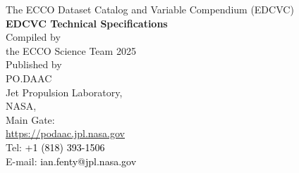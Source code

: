 \pagebreak
\begin{center}
    \vspace*{2cm}
    {\Large The ECCO Dataset Catalog and Variable Compendium (EDCVC)}\\[2cm]
    {\LARGE \textbf{EDCVC Technical Specifications}}\\[2cm]
    {\large Compiled by\\the ECCO Science Team 2025}\\[2cm]
    {\large Published by \\PO.DAAC\\
    Jet Propulsion Laboratory,\\
    NASA,\\
    Main Gate:\\
    \url{https://podaac.jpl.nasa.gov}}\\[2cm]
    {\large Tel: \textcolor{black}{+1 (818) 393-1506}\\[.5cm]
    E-mail: \textcolor{black}{ian.fenty@jpl.nasa.gov}}\\[2cm]
\end{center}


\newpage




